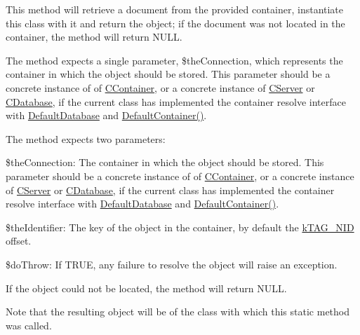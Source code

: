 This method will retrieve a document from the provided container, instantiate this class with it and return the object; if the document was not located in the container, the method will return {\ttfamily N\-U\-L\-L}.

The method expects a single parameter, {\ttfamily \$the\-Connection}, which represents the container in which the object should be stored. This parameter should be a concrete instance of of \hyperlink{class_c_container}{C\-Container}, or a concrete instance of \hyperlink{class_c_server}{C\-Server} or \hyperlink{class_c_database}{C\-Database}, if the current class has implemented the container resolve interface with \hyperlink{class_c_persistent_document_a6092e640e36485873b70a79db464e0ff}{Default\-Database} and \hyperlink{class_c_persistent_document_ada019252d242b5a88a26b82a18e29ed6}{Default\-Container()}.

The method expects two parameters\-:


\begin{DoxyItemize}
\item {\ttfamily \$the\-Connection}\-: The container in which the object should be stored. This parameter should be a concrete instance of of \hyperlink{class_c_container}{C\-Container}, or a concrete instance of \hyperlink{class_c_server}{C\-Server} or \hyperlink{class_c_database}{C\-Database}, if the current class has implemented the container resolve interface with \hyperlink{class_c_persistent_document_a6092e640e36485873b70a79db464e0ff}{Default\-Database} and \hyperlink{class_c_persistent_document_ada019252d242b5a88a26b82a18e29ed6}{Default\-Container()}. 
\item {\ttfamily \$the\-Identifier}\-: The key of the object in the container, by default the \hyperlink{}{k\-T\-A\-G\-\_\-\-N\-I\-D} offset. 
\item {\ttfamily \$do\-Throw}\-: If {\ttfamily T\-R\-U\-E}, any failure to resolve the object will raise an exception. 
\end{DoxyItemize}

If the object could not be located, the method will return {\ttfamily N\-U\-L\-L}.

Note that the resulting object will be of the class with which this static method was called.


